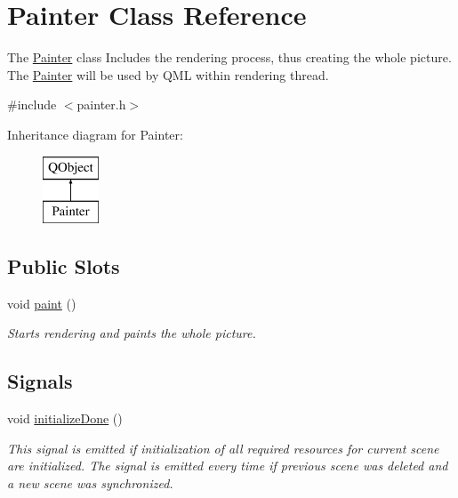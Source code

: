 \hypertarget{class_painter}{\section{Painter Class Reference}
\label{class_painter}
}


The \hyperlink{class_painter}{Painter} class  Includes the rendering process, thus creating the whole picture. The \hyperlink{class_painter}{Painter} will be used by Q\+M\+L within rendering thread.  




{\ttfamily \#include $<$painter.\+h$>$}

Inheritance diagram for Painter\+:\begin{figure}[H]
\begin{center}
\leavevmode
\includegraphics[height=2.000000cm]{class_painter}
\end{center}
\end{figure}
\subsection*{Public Slots}
\begin{DoxyCompactItemize}
\item 
void \hyperlink{class_painter_a5b9b4ed8aebaebeb2f6483e350445fbc}{paint} ()
\begin{DoxyCompactList}\small\item\em Starts rendering and paints the whole picture. \end{DoxyCompactList}\end{DoxyCompactItemize}
\subsection*{Signals}
\begin{DoxyCompactItemize}
\item 
void \hyperlink{class_painter_a171dd523e7ba423b8da554a062168e94}{initialize\+Done} ()
\begin{DoxyCompactList}\small\item\em This signal is emitted if initialization of all required resources for current scene are initialized.  The signal is emitted every time if previous scene was deleted and a new scene was synchronized. \end{DoxyCompactList}\end{DoxyCompactItemize}
